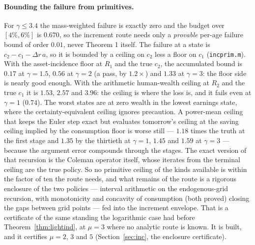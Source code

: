 \paragraph{Bounding the failure from primitives.} For $\gamma\le3.4$ the mass-weighted failure is
exactly zero and the budget over $[4\%,6\%]$ is $0.670$, so the increment route needs only a
\emph{provable} per-age failure bound of order $0.01$, never Theorem 1 itself. The failure at a state
is $c_2-c_1-\Delta r\,a$, so it is bounded by a ceiling on $c_2$ less a floor on $c_1$
(\texttt{incprim.m}). With the asset-incidence floor at $R_1$ and the true $c_2$, the accumulated
bound is $0.17$ at $\gamma=1.5$, $0.56$ at $\gamma=2$ (a pass, by $1.2\times$) and $1.33$ at
$\gamma=3$: the floor side is nearly good enough. With the arithmetic human-wealth ceiling at $R_2$
and the true $c_1$ it is $1.53$, $2.57$ and $3.96$: the ceiling is where the loss is, and it fails
even at $\gamma=1$ ($0.74$). The worst states are at zero wealth in the lowest earnings state, where
the certainty-equivalent ceiling ignores precaution. A power-mean ceiling that keeps the Euler step
exact but evaluates tomorrow's ceiling at the saving ceiling implied by the consumption floor is worse
still --- $1.18$ times the truth at the first stage and $1.35$ by the thirtieth at $\gamma=1$, $1.45$
and $1.59$ at $\gamma=3$ --- because the argument error compounds through the stages. The exact
version of that recursion is the Coleman operator itself, whose iterates from the terminal ceiling
are the true policy. So no primitive ceiling of the kinds available is within the factor of ten the
route needs, and what remains of the route is a rigorous enclosure of the two policies --- interval
arithmetic on the endogenous-grid recursion, with monotonicity and concavity of consumption
(both proved) closing the gaps between grid points --- fed into the increment envelope. That is a
certificate of the same standing the logarithmic case had before Theorem~\ref{thm:lightind}, at
$\mu=3$ where no analytic route is known. It is built, and it certifies $\mu=2$, $3$ and $5$
(Section~\ref{sec:inc}, the enclosure certificate).

